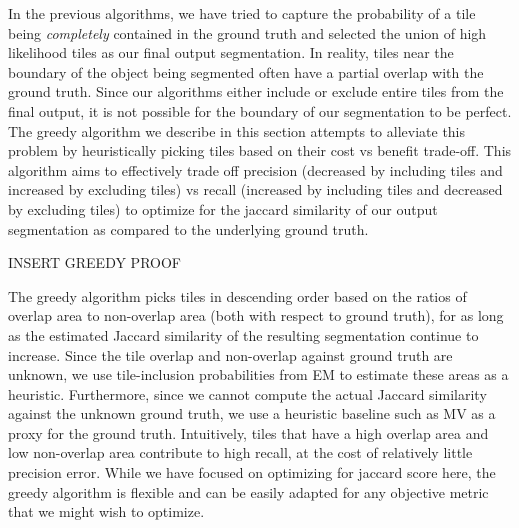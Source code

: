 In the previous algorithms, we have tried to capture the probability of a tile being {\em completely} contained in the ground truth and selected the union of high likelihood tiles as our final output segmentation. In reality, tiles near the boundary of the object being segmented often have a partial overlap with the ground truth. Since our algorithms either include or exclude entire tiles from the final output, it is not possible for the boundary of our segmentation to be perfect.
The greedy algorithm we describe in this section attempts to alleviate this problem by heuristically picking tiles based on their cost vs benefit trade-off. This algorithm aims to effectively trade off precision (decreased by including tiles and increased by excluding tiles) vs recall (increased by including tiles and decreased by excluding tiles) to optimize for the jaccard similarity of our output segmentation as compared to the underlying ground truth.

INSERT GREEDY PROOF 

\par \noindent The greedy algorithm picks tiles in descending order based on the ratios of overlap area to non-overlap area (both with respect to ground truth), for as long as the estimated Jaccard similarity of the resulting segmentation continue to increase. Since the tile overlap and non-overlap against ground truth are unknown, we use tile-inclusion probabilities from EM to estimate these areas as a heuristic. Furthermore, since we cannot compute the actual Jaccard similarity against the unknown ground truth, we use a heuristic baseline such as MV as a proxy for the ground truth. Intuitively, tiles that have a high overlap area and low non-overlap area contribute to high recall, at the cost of relatively little precision error. 
While we have focused on optimizing for jaccard score here, the greedy algorithm is flexible and can be easily adapted for any objective metric that we might wish to optimize. 